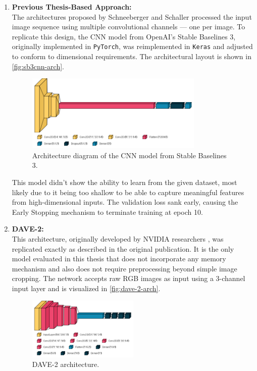 \begin{enumerate}
  \item \textbf{Previous Thesis-Based Approach:} \\
    The architectures proposed by Schneeberger \autocite{schneeberger2024end} and Schaller \autocite{schaller2023train} processed the input image sequence using multiple convolutional channels --- one per image. To replicate this design, the CNN model from OpenAI’s Stable Baselines 3, originally implemented in \texttt{PyTorch}, was reimplemented in \texttt{Keras} and adjusted to conform to dimensional requirements. The architectural layout is shown in \autoref{fig:sb3cnn-arch}.

    \begin{figure}[htbp]
      \centering
      \includegraphics[width=0.8\textwidth]{Images/SB3CNN_architecture.png}
      \caption{Architecture diagram of the CNN model from Stable Baselines 3.}
      \label{fig:sb3cnn-arch}
    \end{figure}

    This model didn't show the ability to learn from the given dataset, most likely due to it being too shallow to be able to capture meaningful features from high-dimensional inputs. The validation loss sank early, causing the Early Stopping mechanism to terminate training at epoch 10.

  \item \textbf{DAVE-2:} \\
    This architecture, originally developed by NVIDIA researchers \autocite{bojarski2016endendlearningselfdriving}, was replicated exactly as described in the original publication. It is the only model evaluated in this thesis that does not incorporate any memory mechanism and also does not require preprocessing beyond simple image cropping. The network accepts raw RGB images as input using a 3-channel input layer and is visualized in \autoref{fig:dave-2-arch}.

    \begin{figure}[htbp]
      \centering
      \includegraphics[width=0.5\textwidth]{Images/DAVE-2_architecture.png}
      \caption{DAVE-2 architecture.}
      \label{fig:dave-2-arch}
    \end{figure}


\end{enumerate}
